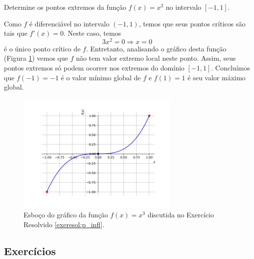 \begin{exeresol}\label{exeresol:p_infl}
  Determine os pontos extremos da função $f(x)=x^3$ no intervalo $[-1, 1]$.
\end{exeresol}
\begin{resol}
  Como $f$ é diferenciável no intervalo $(-1, 1)$, temos que seus pontos críticos são tais que $f'(x)=0$. Neste caso, temos
  \begin{equation}
    3x^2=0\Rightarrow x=0
  \end{equation}
  é o único ponto crítico de $f$. Entretanto, analisando o gráfico desta função (Figura \ref{fig:exeresol_p_infl}) vemos que $f$ não tem valor extremo local neste ponto. Assim, seus pontos extremos só podem ocorrer nos extremos do domínio $[-1, 1]$. Concluímos que $f(-1)=-1$ é o valor mínimo global de $f$ e $f(1)=1$ é seu valor máximo global.

  \begin{figure}[H]
    \centering
    \includegraphics[width=0.7\textwidth]{./cap_apderiv/dados/fig_exeresol_p_infl/fig_exeresol_p_infl}
    \caption{Esboço do gráfico da função $f(x) = x^3$ discutida no Exercício Resolvido \ref{exeresol:p_infl}.}
    \label{fig:exeresol_p_infl}
  \end{figure}
\end{resol}

\subsection*{Exercícios}

